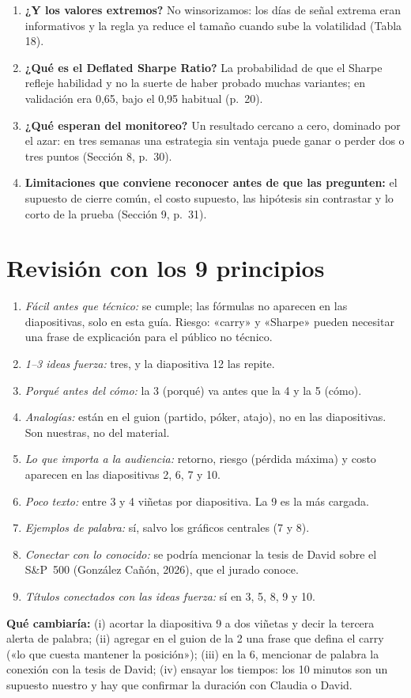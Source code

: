 \documentclass[11pt]{article}
\begin{document}
\begin{enumerate}[leftmargin=*]
\item \textbf{¿Y los valores extremos?} No winsorizamos: los días de señal extrema eran informativos y la regla ya reduce el tamaño cuando sube la volatilidad (Tabla 18).
\item \textbf{¿Qué es el Deflated Sharpe Ratio?} La probabilidad de que el Sharpe refleje habilidad y no la suerte de haber probado muchas variantes; en validación era 0,65, bajo el 0,95 habitual (p.~20).
\item \textbf{¿Qué esperan del monitoreo?} Un resultado cercano a cero, dominado por el azar: en tres semanas una estrategia sin ventaja puede ganar o perder dos o tres puntos (Sección 8, p.~30).
\item \textbf{Limitaciones que conviene reconocer antes de que las pregunten:} el supuesto de cierre común, el costo supuesto, las hipótesis sin contrastar y lo corto de la prueba (Sección 9, p.~31).
\end{enumerate}

\section{Revisión con los 9 principios}
\begin{enumerate}[leftmargin=*]
\item \emph{Fácil antes que técnico:} se cumple; las fórmulas no aparecen en las diapositivas, solo en esta guía. Riesgo: «carry» y «Sharpe» pueden necesitar una frase de explicación para el público no técnico.
\item \emph{1--3 ideas fuerza:} tres, y la diapositiva 12 las repite.
\item \emph{Porqué antes del cómo:} la 3 (porqué) va antes que la 4 y la 5 (cómo).
\item \emph{Analogías:} están en el guion (partido, póker, atajo), no en las diapositivas. Son nuestras, no del material.
\item \emph{Lo que importa a la audiencia:} retorno, riesgo (pérdida máxima) y costo aparecen en las diapositivas 2, 6, 7 y 10.
\item \emph{Poco texto:} entre 3 y 4 viñetas por diapositiva. La 9 es la más cargada.
\item \emph{Ejemplos de palabra:} sí, salvo los gráficos centrales (7 y 8).
\item \emph{Conectar con lo conocido:} se podría mencionar la tesis de David sobre el S\&P~500 (González Cañón, 2026), que el jurado conoce.
\item \emph{Títulos conectados con las ideas fuerza:} sí en 3, 5, 8, 9 y 10.
\end{enumerate}
\textbf{Qué cambiaría:} (i) acortar la diapositiva 9 a dos viñetas y decir la tercera alerta de palabra; (ii) agregar en el guion de la 2 una frase que defina el carry («lo que cuesta mantener la posición»); (iii) en la 6, mencionar de palabra la conexión con la tesis de David; (iv) ensayar los tiempos: los 10 minutos son un supuesto nuestro y hay que confirmar la duración con Claudia o David.
\end{document}
